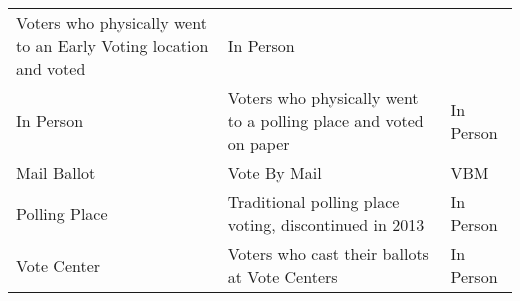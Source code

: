 \documentclass[12pt,twoside]{reedthesis}
\begin{document}
\begin{longtable}[]{@{}lll@{}}
\begin{minipage}[t]{0.62\columnwidth}
  Voters who physically went to an Early Voting location and voted\strut
  \end{minipage} & \begin{minipage}[t]{0.16\columnwidth}\raggedright\strut
  In Person\strut
  \end{minipage}\tabularnewline
  \begin{minipage}[t]{0.13\columnwidth}\raggedright\strut
  In Person\strut
  \end{minipage} & \begin{minipage}[t]{0.62\columnwidth}\raggedright\strut
  Voters who physically went to a polling place and voted on paper\strut
  \end{minipage} & \begin{minipage}[t]{0.16\columnwidth}\raggedright\strut
  In Person\strut
  \end{minipage}\tabularnewline
  \begin{minipage}[t]{0.13\columnwidth}\raggedright\strut
  Mail Ballot\strut
  \end{minipage} & \begin{minipage}[t]{0.62\columnwidth}\raggedright\strut
  Vote By Mail\strut
  \end{minipage} & \begin{minipage}[t]{0.16\columnwidth}\raggedright\strut
  VBM\strut
  \end{minipage}\tabularnewline
  \begin{minipage}[t]{0.13\columnwidth}\raggedright\strut
  Polling Place\strut
  \end{minipage} & \begin{minipage}[t]{0.62\columnwidth}\raggedright\strut
  Traditional polling place voting, discontinued in 2013\strut
  \end{minipage} & \begin{minipage}[t]{0.16\columnwidth}\raggedright\strut
  In Person\strut
  \end{minipage}\tabularnewline
  \begin{minipage}[t]{0.13\columnwidth}\raggedright\strut
  Vote Center\strut
  \end{minipage} & \begin{minipage}[t]{0.62\columnwidth}\raggedright\strut
  Voters who cast their ballots at Vote Centers\strut
  \end{minipage} & \begin{minipage}[t]{0.16\columnwidth}\raggedright\strut
  In Person\strut
  \end{minipage}\tabularnewline
  \bottomrule
  \end{longtable}
  
\end{document}
